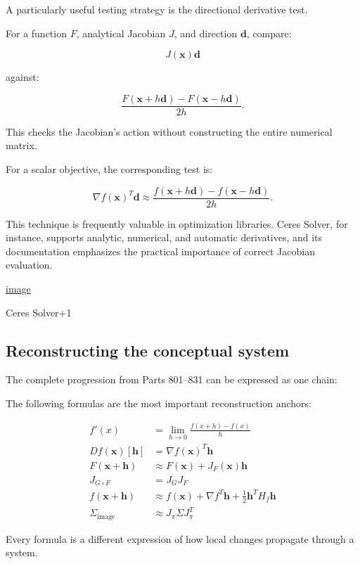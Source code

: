 A particularly useful testing strategy is the directional derivative test.

For a function \(F\), analytical Jacobian \(J\), and direction \(\mathbf d\), compare:

\[
J(\mathbf x)\mathbf d
\]

against:

\[
\frac{ F(\mathbf x+h\mathbf d) - F(\mathbf x-h\mathbf d) }{2h}.
\]

This checks the Jacobian's action without constructing the entire numerical matrix.

For a scalar objective, the corresponding test is:

\[
\nabla f(\mathbf x)^T\mathbf d \approx \frac{ f(\mathbf x+h\mathbf d) - f(\mathbf x-h\mathbf d) }{2h}.
\]

This technique is frequently valuable in optimization libraries. Ceres Solver, for instance, supports analytic, numerical, and automatic derivatives, and its documentation emphasizes the practical importance of correct Jacobian evaluation. 

\href{https://www.google.com/s2/favicons?domain=https://ceres-solver.readthedocs.io&sz=32}{image}

Ceres Solver+1

\subsection{Reconstructing the conceptual system}\label{02-foundations-ii-ch021-reconstructing-the-conceptual-system}

The complete progression from Parts 801--831 can be expressed as one chain:

The following formulas are the most important reconstruction anchors:

\[
\boxed{ \begin{aligned} f'(x)&=\lim_{h\to0}\frac{f(x+h)-f(x)}h\\[3pt] Df(\mathbf x)[\mathbf h]&=\nabla f(\mathbf x)^T\mathbf h\\[3pt] F(\mathbf x+\mathbf h)&\approx F(\mathbf x)+J_F(\mathbf x)\mathbf h\\[3pt] J_{G\circ F}&=J_GJ_F\\[3pt] f(\mathbf x+\mathbf h)&\approx f(\mathbf x)+\nabla f^T\mathbf h+ \frac12\mathbf h^TH_f\mathbf h\\[3pt] \Sigma_{\text{image}}&\approx J_\pi\Sigma J_\pi^T \end{aligned} }
\]

Every formula is a different expression of how local changes propagate through a system.


